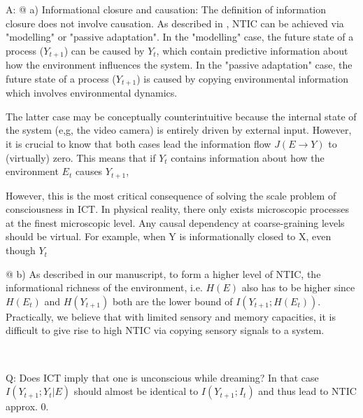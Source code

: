 \documentclass[utf8]{article}
\newcounter{cQuestion}[section]
\newenvironment{question}
    {\refstepcounter{cQuestion}\color{Blue}\noindent\newline Q\thecQuestion:}
    {~\newline}
\newenvironment{ans}  
    {\color{Black}\noindent A:}
    {~\newline}
\begin{document}
\begin{ans}
	    @ a) Informational closure and causation: The definition of information closure \citep{BERTSCHINGER.2006} does not involve causation. As described in \cite{BERTSCHINGER.2006}, NTIC can be achieved via "modelling" or "passive adaptation".  In the "modelling" case, the future state of a process ($Y_{t+1}$) can be caused by $Y_t$, which contain predictive information about how the environment influences the system. In the "passive adaptation" case,  the future state of a process ($Y_{t+1}$) is caused by copying environmental information which involves environmental dynamics. 
	    
	    The latter case may be conceptually counterintuitive because the internal state of the system (e,g, the video camera) is entirely driven by external input. However, it is crucial to know that both cases lead the information flow $J(E\rightarrow Y)$ to (virtually) zero. This means that if $Y_t$ contains information about how the environment $E_t$ causes $Y_{t+1}$, 
	    
	    However, this is the most critical consequence of solving the scale problem of consciousness in ICT. In physical reality, there only exists microscopic processes at the finest microscopic level. Any causal dependency at coarse-graining levels should be virtual. For example, when Y is informationally closed to X, even though $Y_t$
	    
	    @ b) As described in our manuscript, to form a higher level of NTIC, the informational richness of the environment, i.e. $H(E)$ also has to be higher since $H(E_t)$ and $H(Y_{t+1})$ both are the lower bound of $I(Y_{t+1}; H(E_t))$. Practically, we believe that with limited sensory and memory capacities, it is difficult to give rise to high NTIC via copying sensory signals to a system. 
	    
	    
	    
	    
            
            
        \end{ans}
        
        \begin{question}
            Does ICT imply that one is unconscious while dreaming? In that case $I(Y_{t+1}; Y_t|E)$ should almost be identical to $I(Y_{t+1};I_t)$ and thus lead to NTIC approx. 0.        
        \end{question}
    
\end{document}
